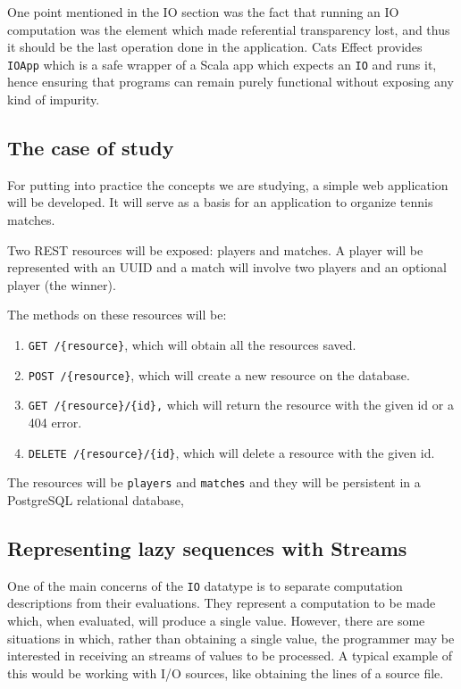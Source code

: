\documentclass[../main.tex]{subfiles}
\begin{document}
One point mentioned in the IO section was the fact that running an IO computation was the
element which made referential transparency lost, and thus it should be the last
operation done in the application. Cats Effect provides \texttt{IOApp} which is
a safe wrapper of a Scala app which expects an \texttt{IO} and runs it, hence ensuring
that programs can remain purely functional without exposing any kind of impurity.

\subsection{The case of study}
For putting into practice the concepts we are studying, a simple web application will be
developed. It will serve as a basis for an application to organize tennis
matches.

Two REST resources will be exposed: players and matches. A player will be
represented with an UUID and a match will involve two players and an optional
player (the winner).

The methods on these resources will be:
\begin{enumerate}
\item \texttt{GET /\{resource\}}, which will obtain all the resources saved.
\item \texttt{POST /\{resource\}}, which will create a new resource on the
  database.
\item \texttt{GET /\{resource\}/\{id\},} which will return the resource with the
  given id or a 404 error.
\item \texttt{DELETE /\{resource\}/\{id\}}, which will delete a resource with the
  given id.
\end{enumerate}

The resources will be \texttt{players} and \texttt{matches} and they will be
persistent in a PostgreSQL relational database,

\subsection{Representing lazy sequences with Streams}
One of the main concerns of the \texttt{IO} datatype is to separate computation
descriptions from their evaluations. They represent a computation to be
made which, when evaluated, will produce a single value. However, there are some
situations in which, rather than obtaining a single value, the programmer may be
interested in receiving an streams of values to be processed. A typical example
of this would be working with I/O sources, like obtaining the lines of a source
file.
\end{document}
